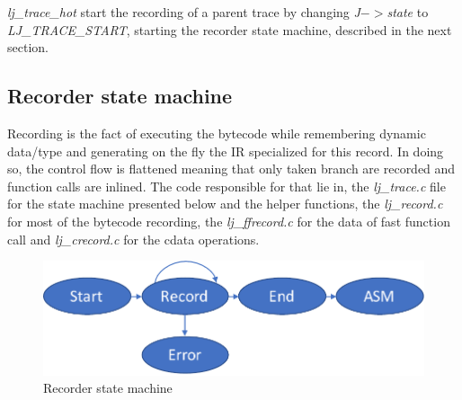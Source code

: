 \emph{lj\_trace\_hot} start the recording of a parent trace by changing
\emph{J$->$state} to \emph{LJ\_TRACE\_START}, starting the recorder state
machine, described in the next section.



\subsection{Recorder state machine}
\label{Subsec:recorder-state-machine}

Recording is the fact of executing the bytecode while remembering dynamic
data/type and generating on the fly the IR specialized for this record. In
doing so, the control flow is flattened meaning that only taken branch are
recorded and function calls are inlined. The code responsible for that lie in, the
\emph{lj\_trace.c} file for the state machine presented below and the helper
functions, the \emph{lj\_record.c} for most of the bytecode recording,
the \emph{lj\_ffrecord.c} for the data of fast function call and
\emph{lj\_crecord.c} for the cdata operations.

\begin{figure}[H]
    \centering
	\includegraphics[width=\textwidth]{./Images/FSM.pdf}
    \caption{Recorder state machine}
    \label{fig:recorder-state-machine}
\end{figure}


